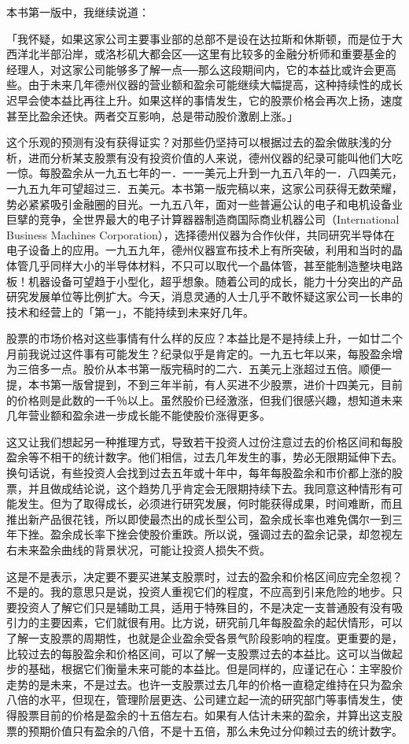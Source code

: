 \documentclass[UTF8,a4paper,zihao=-4,fontset = windows]{ctexart} %
\begin{document}
本书第一版中，我继续说道：

「我怀疑，如果这家公司主要事业部的总部不是设在达拉斯和休斯顿，而是位于大西洋北半部沿岸，或洛杉矶大都会区──这里有比较多的金融分析师和重要基金的经理人，对这家公司能够多了解一点──那么这段期间内，它的本益比或许会更高些。由于未来几年德州仪器的营业额和盈余可能继续大幅提高，这种持续性的成长迟早会使本益比再往上升。如果这样的事情发生，它的股票价格会再次上扬，速度甚至比盈余还快。两者交互影响，总是带动股价激剧上涨。」

这个乐观的预测有没有获得证实？对那些仍坚持可以根据过去的盈余做肤浅的分析，进而分析某支股票有没有投资价值的人来说，德州仪器的纪录可能叫他们大吃一惊。每股盈余从一九五七年的一．一一美元上升到一九五八年的一．八四美元，一九五九年可望超过三．五美元。本书第一版完稿以来，这家公司获得无数荣耀，势必紧紧吸引金融圈的目光。一九五八年，面对一些普遍公认的电子和电机设备业巨擘的竞争，全世界最大的电子计算器器制造商国际商业机器公司（International Business Machines Corporation），选择德州仪器为合作伙伴，共同研究半导体在电子设备上的应用。一九五九年，德州仪器宣布技术上有所突破，利用和当时的晶体管几乎同样大小的半导体材料，不只可以取代一个晶体管，甚至能制造整块电路板！机器设备可望趋于小型化，超乎想象。随着公司的成长，能力十分突出的产品研究发展单位等比例扩大。今天，消息灵通的人士几乎不敢怀疑这家公司一长串的技术和经营上的「第一」，不能持续到未来好几年。

股票的市场价格对这些事情有什么样的反应？本益比是不是持续上升，一如廿二个月前我说过这件事有可能发生？纪录似乎是肯定的。一九五七年以来，每股盈余增为三倍多一点。股价从本书第一版完稿时的二六．五美元上涨超过五倍。顺便一提，本书第一版曾提到，不到三年半前，有人买进不少股票，进价十四美元，目前的价格则是此数的一千％以上。虽然股价已经激涨，但我们很感兴趣，想知道未来几年营业额和盈余进一步成长能不能使股价涨得更多。

这又让我们想起另一种推理方式，导致若干投资人过份注意过去的价格区间和每股盈余等不相干的统计数字。他们相信，过去几年发生的事，势必无限期延伸下去。换句话说，有些投资人会找到过去五年或十年中，每年每股盈余和市价都上涨的股票，并且做成结论说，这个趋势几乎肯定会无限期持续下去。我同意这种情形有可能发生。但为了取得成长，必须进行研究发展，何时能获得成果，时间难断，而且推出新产品很花钱，所以即使最杰出的成长型公司，盈余成长率也难免偶尔一到三年下挫。盈余成长率下挫会使股价重跌。所以说，强调过去的盈余记录，却忽视左右未来盈余曲线的背景状况，可能让投资人损失不赀。

这是不是表示，决定要不要买进某支股票时，过去的盈余和价格区间应完全忽视？不是的。我的意思只是说，投资人重视它们的程度，不应高到引来危险的地步。只要投资人了解它们只是辅助工具，适用于特殊目的，不是决定一支普通股有没有吸引力的主要因素，它们就很有用。比方说，研究前几年每股盈余的起伏情形，可以了解一支股票的周期性，也就是企业盈余受各景气阶段影响的程度。更重要的是，比较过去的每股盈余和价格区间，可以了解一支股票过去的本益比。这可以当做起步的基础，根据它们衡量未来可能的本益比。但是同样的，应谨记在心：主宰股价走势的是未来，不是过去。也许一支股票过去几年的价格一直稳定维持在只为盈余八倍的水平，但现在，管理阶层更迭、公司建立起一流的研究部门等事情发生，使得股票目前的价格是盈余的十五倍左右。如果有人估计未来的盈余，并算出这支股票的预期价值只有盈余的八倍，不是十五倍，那么未免过分仰赖过去的统计数字。
\end{document}
